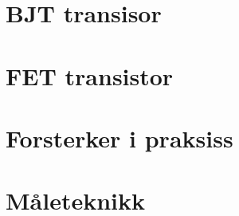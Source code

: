 \documentclass[12pt]{report}
\begin{document}
\section{BJT transisor}

\section{FET transistor}

\section{Forsterker i praksiss}

\section{Måleteknikk}

\newpage

\printbibliography[heading=bibintoc, title={Referanser}]
\end{document}
